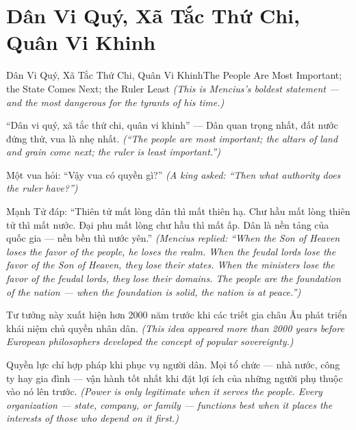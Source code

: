 \section{Dân Vi Quý, Xã Tắc Thứ Chi, Quân Vi Khinh}
\begin{truyen}{Dân Vi Quý, Xã Tắc Thứ Chi, Quân Vi Khinh}{The People Are Most Important; the State Comes Next; the Ruler Least}
\textit{(This is Mencius's boldest statement — and the most dangerous for the tyrants of his time.)}

``Dân vi quý, xã tắc thứ chi, quân vi khinh'' — Dân quan trọng nhất, đất nước đứng thứ, vua là nhẹ nhất.
\textit{(``The people are most important; the altars of land and grain come next; the ruler is least important.'')}

Một vua hỏi: ``Vậy vua có quyền gì?''
\textit{(A king asked: ``Then what authority does the ruler have?'')}

Mạnh Tử đáp: ``Thiên tử mất lòng dân thì mất thiên hạ. Chư hầu mất lòng thiên tử thì mất nước. Đại phu mất lòng chư hầu thì mất ấp. Dân là nền tảng của quốc gia — nền bền thì nước yên.''
\textit{(Mencius replied: ``When the Son of Heaven loses the favor of the people, he loses the realm. When the feudal lords lose the favor of the Son of Heaven, they lose their states. When the ministers lose the favor of the feudal lords, they lose their domains. The people are the foundation of the nation — when the foundation is solid, the nation is at peace.'')}

Tư tưởng này xuất hiện hơn 2000 năm trước khi các triết gia châu Âu phát triển khái niệm chủ quyền nhân dân.
\textit{(This idea appeared more than 2000 years before European philosophers developed the concept of popular sovereignty.)}

\end{truyen}

\begin{baihoc}
Quyền lực chỉ hợp pháp khi phục vụ người dân. Mọi tổ chức — nhà nước, công ty hay gia đình — vận hành tốt nhất khi đặt lợi ích của những người phụ thuộc vào nó lên trước.
\textit{(Power is only legitimate when it serves the people. Every organization — state, company, or family — functions best when it places the interests of those who depend on it first.)}
\end{baihoc}
\ngancach

